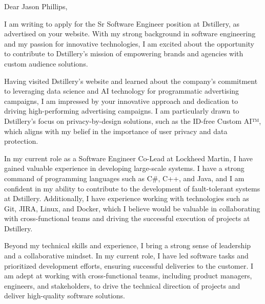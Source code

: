 \documentclass[line,overlapped]{res}
\begin{document}

\noindent
\makebox[0pt][l]{}%
\makebox[\textwidth][c]{}%
\makebox[0pt][l]{}%
\makebox[\textwidth][c]{}%
\makebox[0pt][l]{}%
\makebox[\textwidth][c]{}%
\makebox[0pt][l]{}%
\makebox[\textwidth][c]{}%

\begin{resume}

Dear Jason Phillips,

I am writing to apply for the Sr Software Engineer position at Dstillery, as advertised on your website. With my strong background in software engineering and my passion for innovative technologies, I am excited about the opportunity to contribute to Dstillery's mission of empowering brands and agencies with custom audience solutions.

Having visited Dstillery's website and learned about the company's commitment to leveraging data science and AI technology for programmatic advertising campaigns, I am impressed by your innovative approach and dedication to driving high-performing advertising campaigns. I am particularly drawn to Dstillery's focus on privacy-by-design solutions, such as the ID-free Custom AI™, which aligns with my belief in the importance of user privacy and data protection.

In my current role as a Software Engineer Co-Lead at Lockheed Martin, I have gained valuable experience in developing large-scale systems. I have a strong command of programming languages such as C\#, C++, and Java, and I am confident in my ability to contribute to the development of fault-tolerant systems at Dstillery. Additionally, I have experience working with technologies such as Git, JIRA, Linux, and Docker, which I believe would be valuable in collaborating with cross-functional teams and driving the successful execution of projects at Dstillery.

Beyond my technical skills and experience, I bring a strong sense of leadership and a collaborative mindset. In my current role, I have led software tasks and prioritized development efforts, ensuring successful deliveries to the customer. I am adept at working with cross-functional teams, including product managers, engineers, and stakeholders, to drive the technical direction of projects and deliver high-quality software solutions.


\end{resume}
\end{document}
